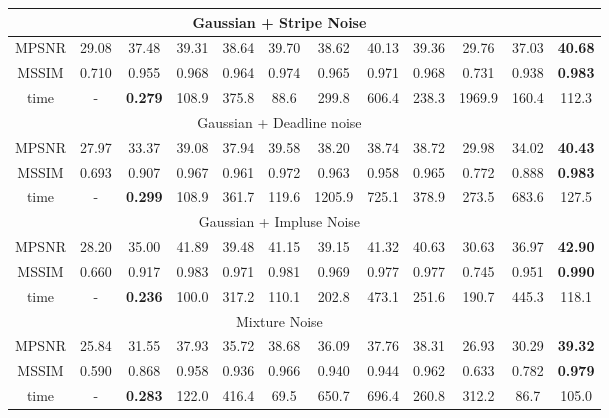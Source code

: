 \documentclass[journal]{IEEEtran}
\begin{document}
\begin{table*}
\begin{center}
{{\begin{tabular}{c c c c c c c c c c c c}
								\hline
								\multicolumn{11}{c}{Gaussian + Stripe Noise}\\ \hline
								MPSNR & 29.08  & 37.48  & 39.31 & 38.64  & 39.70 & 38.62  & 40.13  & 39.36 & 29.76 & 37.03  & {\bf{40.68}}\\
								MSSIM & 0.710  & 0.955    & 0.968 & 0.964    & 0.974 & 0.965  & 0.971 & 0.968 & 0.731   & 0.938 & {\bf{0.983}} \\
								time & 	- & \bf{0.279} 	& 108.9 &375.8	&88.6	& 299.8	&606.4	& 238.3 & 1969.9	& 160.4 &112.3					\\		
								\hline
								\multicolumn{11}{c}{ Gaussian + Deadline noise}\\ \hline
								MPSNR & 27.97  & 33.37  & 39.08 & 37.94   & 39.58 & 38.20  &  38.74  & 38.72 & 29.98   & 34.02 & {\bf{40.43}}\\
								MSSIM & 0.693  & 0.907   & 0.967 & 0.961    & 0.972 & 0.963 & 0.958 & 0.965 & 0.772  & 0.888 & {\bf{0.983}} \\
								time & 	- & \bf{0.299}	& 108.9 & 361.7	&119.6	&  1205.9	& 725.1 &378.9  & 273.5 	& 683.6    & 127.5
								\\
								\hline
								\multicolumn{11}{c}{Gaussian + Impluse Noise}\\ \hline
								MPSNR & 28.20  & 35.00 & 41.89 & 39.48  & 41.15 & 39.15&41.32  & 40.63  & 30.63 & 36.97   & {\bf{42.90}}\\
								MSSIM & 0.660  & 0.917 & 0.983 & 0.971  & 0.981 & 0.969  &  0.977 & 0.977 & 0.745  & 0.951 & {\bf{0.990}} \\
								time & 	- & \bf{0.236} 	& 100.0 & 317.2 &110.1	& 202.8 & 473.1	&251.6 & 190.7	& 445.3 & 118.1
								\\						
								\hline
								\multicolumn{11}{c}{Mixture Noise}\\ \hline
								MPSNR & 25.84   & 31.55  & 37.93 & 35.72   & 38.68 & 36.09 &  37.76  & 38.31 & 26.93   & 30.29 & {\bf{39.32}}\\
								MSSIM & 0.590  & 0.868   & 0.958& 0.936  & 0.966 &  0.940  &  0.944 & 0.962 & 0.633  & 0.782 & {\bf{0.979}} \\
								time & 	- & \bf{0.283} 	& 122.0 &	416.4	& 69.5	& 650.7	&696.4 &260.8 & 312.2 & 86.7 &105.0
								\\						
								\hline						
							\end{tabular}}
						}
					\end{center}					
				\end{table*}
					
\end{document}
